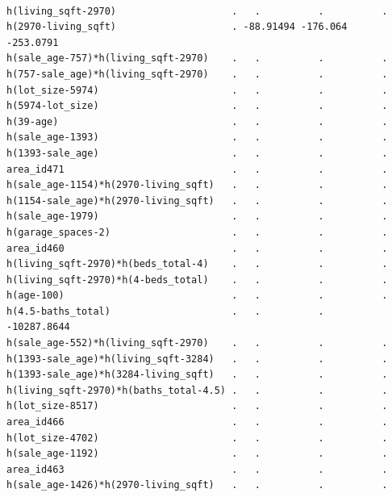 \documentclass[
]{article}
\begin{document}
\begin{verbatim}
                                                                       
h(living_sqft-2970)                    .   .          .          .     
h(2970-living_sqft)                    . -88.91494 -176.064   -253.0791
h(sale_age-757)*h(living_sqft-2970)    .   .          .          .     
h(757-sale_age)*h(living_sqft-2970)    .   .          .          .     
h(lot_size-5974)                       .   .          .          .     
h(5974-lot_size)                       .   .          .          .     
h(39-age)                              .   .          .          .     
h(sale_age-1393)                       .   .          .          .     
h(1393-sale_age)                       .   .          .          .     
area_id471                             .   .          .          .     
h(sale_age-1154)*h(2970-living_sqft)   .   .          .          .     
h(1154-sale_age)*h(2970-living_sqft)   .   .          .          .     
h(sale_age-1979)                       .   .          .          .     
h(garage_spaces-2)                     .   .          .          .     
area_id460                             .   .          .          .     
h(living_sqft-2970)*h(beds_total-4)    .   .          .          .     
h(living_sqft-2970)*h(4-beds_total)    .   .          .          .     
h(age-100)                             .   .          .          .     
h(4.5-baths_total)                     .   .          .     -10287.8644
h(sale_age-552)*h(living_sqft-2970)    .   .          .          .     
h(1393-sale_age)*h(living_sqft-3284)   .   .          .          .     
h(1393-sale_age)*h(3284-living_sqft)   .   .          .          .     
h(living_sqft-2970)*h(baths_total-4.5) .   .          .          .     
h(lot_size-8517)                       .   .          .          .     
area_id466                             .   .          .          .     
h(lot_size-4702)                       .   .          .          .     
h(sale_age-1192)                       .   .          .          .     
area_id463                             .   .          .          .     
h(sale_age-1426)*h(2970-living_sqft)   .   .          .          .     
                                                                              

\end{verbatim}
\end{document}
